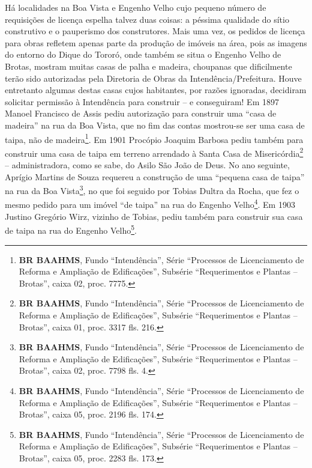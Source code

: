 
Há localidades na Boa Vista e Engenho Velho cujo pequeno número de requisições de licença espelha talvez duas coisas: a péssima qualidade do sítio construtivo e o pauperismo dos construtores. Mais uma vez, os pedidos de licença para obras refletem apenas parte da produção de imóveis na área, pois as imagens do entorno do Dique do Tororó, onde também se situa o Engenho Velho de Brotas, mostram muitas casas de palha e madeira, choupanas que dificilmente terão sido autorizadas pela Diretoria de Obras da Intendência/Prefeitura. Houve entretanto algumas destas casas cujos habitantes, por razões ignoradas, decidiram solicitar permissão à Intendência para construir -- e conseguiram! Em 1897 Manoel Francisco de Assis pediu autorização para construir uma ``casa de madeira'' na rua da Boa Vista, que no fim das contas mostrou-se ser uma casa de taipa, não de madeira\footnote{\textbf{BR BAAHMS}, Fundo ``Intendência'', Série ``Processos de Licenciamento de Reforma e Ampliação de Edificações'', Subsérie ``Requerimentos e Plantas -- Brotas'', caixa 02, proc. 7775.}. Em 1901 Procópio Joaquim Barbosa pediu também para construir uma casa de taipa em terreno arrendado à Santa Casa de Misericórdia\footnote{\textbf{BR BAAHMS}, Fundo ``Intendência'', Série ``Processos de Licenciamento de Reforma e Ampliação de Edificações'', Subsérie ``Requerimentos e Plantas -- Brotas'', caixa 01, proc. 3317 fls. 216.} -- administradora, como se sabe, do Asilo São João de Deus. No ano seguinte, Aprígio Martins de Souza requereu a construção de uma ``pequena casa de taipa'' na rua da Boa Vista\footnote{\textbf{BR BAAHMS}, Fundo ``Intendência'', Série ``Processos de Licenciamento de Reforma e Ampliação de Edificações'', Subsérie ``Requerimentos e Plantas -- Brotas'', caixa 02, proc. 7798 fls. 4.}, no que foi seguido por Tobias Dultra da Rocha, que fez o mesmo pedido para um imóvel ``de taipa'' na rua do Engenho Velho\footnote{\textbf{BR BAAHMS}, Fundo ``Intendência'', Série ``Processos de Licenciamento de Reforma e Ampliação de Edificações'', Subsérie ``Requerimentos e Plantas -- Brotas'', caixa 05, proc. 2196 fls. 174.}. Em 1903 Justino Gregório Wirz, vizinho de Tobias, pediu também para construir sua casa de taipa na rua do Engenho Velho\footnote{\textbf{BR BAAHMS}, Fundo ``Intendência'', Série ``Processos de Licenciamento de Reforma e Ampliação de Edificações'', Subsérie ``Requerimentos e Plantas -- Brotas'', caixa 05, proc. 2283 fls. 173.}. 

